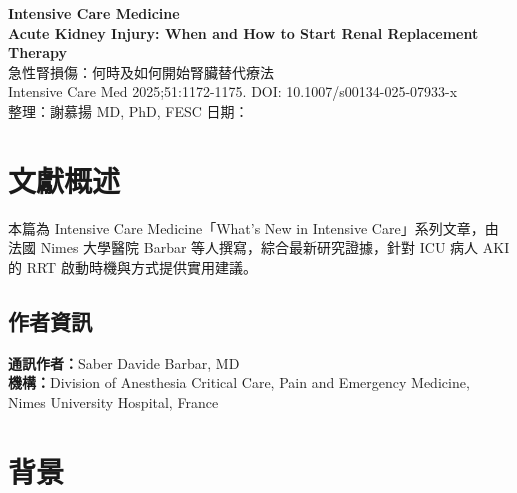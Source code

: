 \documentclass[12pt,a4paper]{article}
\begin{document}
\begin{center}
{\LARGE\bfseries\textcolor{emergency_red}{Intensive Care Medicine}}\\[0.5cm]
{\Large\textbf{Acute Kidney Injury: When and How to Start Renal Replacement Therapy}}\\[0.3cm]
{\large 急性腎損傷：何時及如何開始腎臟替代療法}\\[0.5cm]
{\normalsize Intensive Care Med 2025;51:1172-1175. DOI: 10.1007/s00134-025-07933-x}\\[0.3cm]
{\normalsize 整理：謝慕揚 MD, PhD, FESC \quad 日期：\mydate}
\end{center}


\tableofcontents
\newpage

\section{文獻概述}

本篇為 Intensive Care Medicine「What's New in Intensive Care」系列文章，由法國 Nimes 大學醫院 Barbar 等人撰寫，綜合最新研究證據，針對 ICU 病人 AKI 的 RRT 啟動時機與方式提供實用建議。

\subsection{作者資訊}
\textbf{通訊作者：}Saber Davide Barbar, MD\\
\textbf{機構：}Division of Anesthesia Critical Care, Pain and Emergency Medicine, Nimes University Hospital, France

\section{背景}
\end{document}
